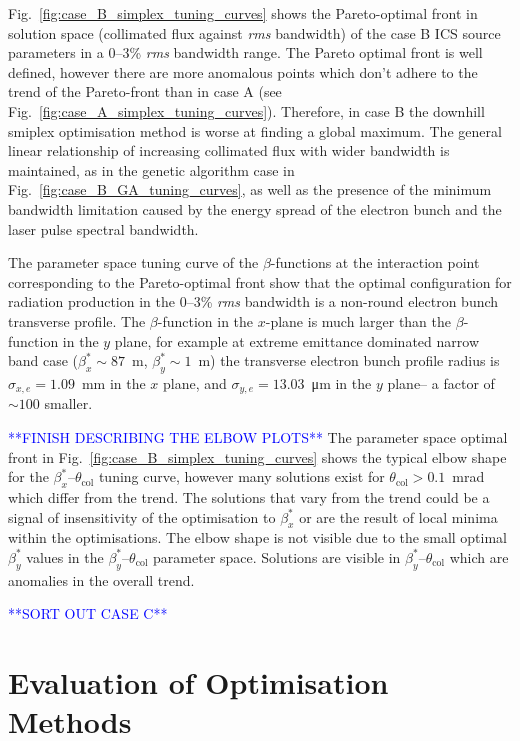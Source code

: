 \documentclass[../main.tex]{subfiles}
\begin{document}
Fig.~\ref{fig:case_B_simplex_tuning_curves} shows the Pareto-optimal front in solution space (collimated flux against \textit{rms} bandwidth) of the case B ICS source parameters in a 0--3\% \textit{rms} bandwidth range. The Pareto optimal front is well defined, however there are more anomalous points which don't adhere to the trend of the Pareto-front than in case A (see Fig.~\ref{fig:case_A_simplex_tuning_curves}). Therefore, in case B the downhill smiplex optimisation method is worse at finding a global maximum. The general linear relationship of increasing collimated flux with wider bandwidth is maintained, as in the genetic algorithm case in Fig.~\ref{fig:case_B_GA_tuning_curves}, as well as the presence of the minimum bandwidth limitation caused by the energy spread of the electron bunch and the laser pulse spectral bandwidth.

The parameter space tuning curve of the $\beta$-functions at the interaction point corresponding to the Pareto-optimal front show that the optimal configuration for radiation production in the 0--3\% \textit{rms} bandwidth is a non-round electron bunch transverse profile. The $\beta$-function in the $x$-plane is much larger than the $\beta$-function in the $y$ plane, for example at extreme emittance dominated narrow band case ($\beta_{x}^{*}\sim87$~\si{\meter}, $\beta_{y}^{*} \sim1$~\si{\meter}) the transverse electron bunch profile radius is $\sigma_{x,e} =1.09$~\si{\milli\meter} in the $x$ plane, and $\sigma_{y,e} =13.03$~\si{\micro\meter} in the $y$ plane-- a factor of $\sim100$ smaller.

\textcolor{blue}{**FINISH DESCRIBING THE ELBOW PLOTS**}
The parameter space optimal front in Fig.~\ref{fig:case_B_simplex_tuning_curves} shows the typical elbow shape for the $\beta_{x}^{*}$--$\theta_{\mathrm{col}}$ tuning curve, however many solutions exist for $\theta_{\mathrm{col}} > 0.1$~\si{\milli\radian} which differ from the trend. The solutions that vary from the trend could be a signal of insensitivity of the optimisation to $\beta_{x}^{*}$ or are the result of local minima within the optimisations. The elbow shape is not visible due to the small optimal $\beta_{y}^{*}$ values in the $\beta_{y}^{*}$--$\theta_{\mathrm{col}}$ parameter space. Solutions are visible in $\beta_{y}^{*}$--$\theta_{\mathrm{col}}$ which are anomalies in the overall trend. 


\textcolor{blue}{**SORT OUT CASE C**}

\section{Evaluation of Optimisation Methods} 
\label{sec:evaluation_of_optimisation_methods}
\end{document}
